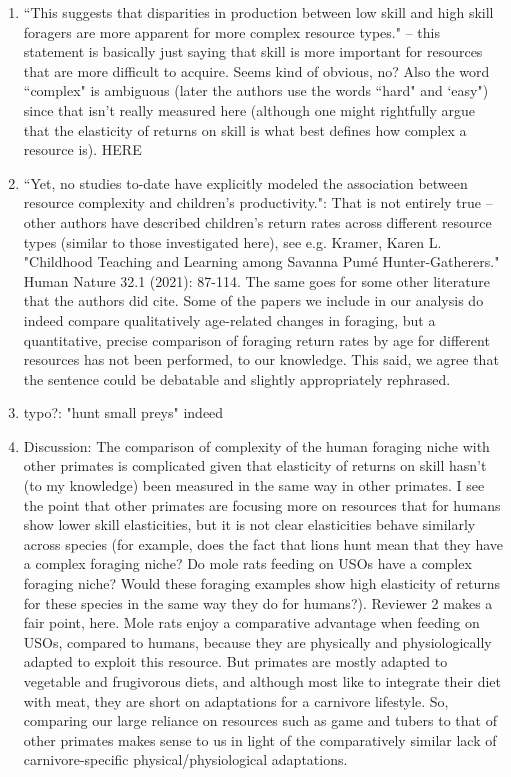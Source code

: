 \documentclass{article}
\newcommand{\rev}[1]{{\color{ForestGreen}#1}}
\begin{document}
\begin{enumerate}
    \item ``This suggests that disparities in production between low skill and high skill foragers are more  apparent for more complex resource types." -- this statement is basically just saying that skill is  more important for resources that are more difficult to acquire. Seems kind of obvious, no? Also  the word ``complex" is ambiguous (later the authors use the words ``hard" and `easy") since that isn't really measured here (although one might rightfully argue that the elasticity of returns on skill is what best defines how complex a resource is). \rev{HERE}
    
    \item ``Yet, no studies to-date have explicitly modeled the association between resource complexity and children's productivity.": That is not entirely true -- other authors have described children's return rates across different resource types (similar to those investigated here), see e.g. Kramer,  Karen L. "Childhood Teaching and Learning among Savanna Pumé Hunter-Gatherers." Human  Nature 32.1 (2021): 87-114. The same goes for some other literature that the authors did cite. \rev{Some of the papers we include in our analysis do indeed compare qualitatively age-related changes in foraging, but a quantitative, precise comparison of foraging return rates by age for different resources has not been performed, to our knowledge. This said, we agree that the sentence could be debatable and slightly appropriately rephrased.}
    
    \item typo?: "hunt small preys" \rev{indeed}
    
    \item Discussion: The comparison of complexity of the human foraging niche with other primates is complicated given that elasticity of returns on skill hasn't (to my knowledge) been measured in  the same way in other primates. I see the point that other primates are focusing more on  resources that for humans show lower skill elasticities, but it is not clear elasticities behave  similarly across species (for example, does the fact that lions hunt mean that they have a  complex foraging niche? Do mole rats feeding on USOs have a complex foraging niche? Would  these foraging examples show high elasticity of returns for these species in the same way they do for humans?). \rev{Reviewer 2 makes a fair point, here. Mole rats enjoy a comparative advantage when feeding on USOs, compared to humans, because they are physically and physiologically adapted to exploit this resource. But primates are mostly adapted to vegetable and frugivorous diets, and although most like to integrate their diet with meat, they are short on adaptations for a carnivore lifestyle. So, comparing our large reliance on resources such as game and tubers to that of other primates makes sense to us in light of the comparatively similar lack of carnivore-specific physical/physiological adaptations. }
    

\end{enumerate}
\end{document}
